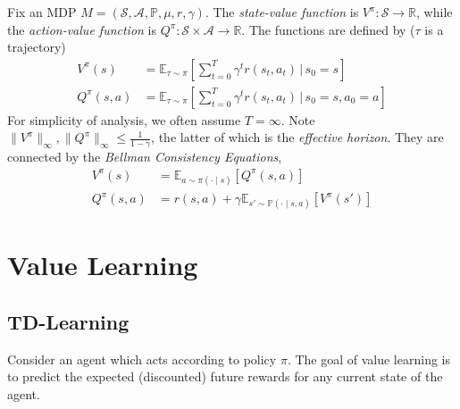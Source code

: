 \documentclass[11pt, letterpaper]{article}
\begin{document}
\begin{concept}
    Fix an MDP \(M = (\mathcal{S}, \mathcal{A}, \mathbb{P}, \mu, r, \gamma)\). The \textit{state-value function} is \(V^\pi : \mathcal{S} \to \mathbb{R}\), while the \textit{action-value function} is \(Q^\pi : \mathcal{S} \times \mathcal{A} \to \mathbb{R}\). The functions are defined by (\(\tau\) is a trajectory)
    \begin{align*}
        V^\pi(s) &= \mathbb{E}_{\tau \sim \pi} \left[ \sum_{t=0}^T \gamma^t r(s_t, a_t) \,\biggr\rvert\, s_0 = s \right] \\
        Q^\pi(s, a) &= \mathbb{E}_{\tau \sim \pi} \left[ \sum_{t=0}^T \gamma^t r(s_t, a_t) \,\biggr\rvert\, s_0 = s, a_0 = a \right]
    \end{align*}
    For simplicity of analysis, we often assume \(T = \infty\). Note \(\|V^\pi\|_{\infty}, \|Q^\pi\|_{\infty} \leq \frac{1}{1 - \gamma}\), the latter of which is the \textit{effective horizon}. They are connected by the \textit{Bellman Consistency Equations}, 
    \begin{align*}
        V^\pi(s) &= \mathbb{E}_{a \sim \pi(\cdot \mid s)} [Q^\pi(s, a)] \\
        Q^\pi(s, a) &= r(s, a) + \gamma \mathbb{E}_{s' \sim \mathbb{P}(\cdot \mid s, a)} [V^\pi(s')]
    \end{align*}
\end{concept}

\newpage
\section{Value Learning}

\subsection{TD-Learning}

\begin{concept}
    Consider an agent which acts according to policy \(\pi\). The goal of value learning is to predict the expected (discounted) future rewards for any current state of the agent. 
\end{concept}
\end{document}
